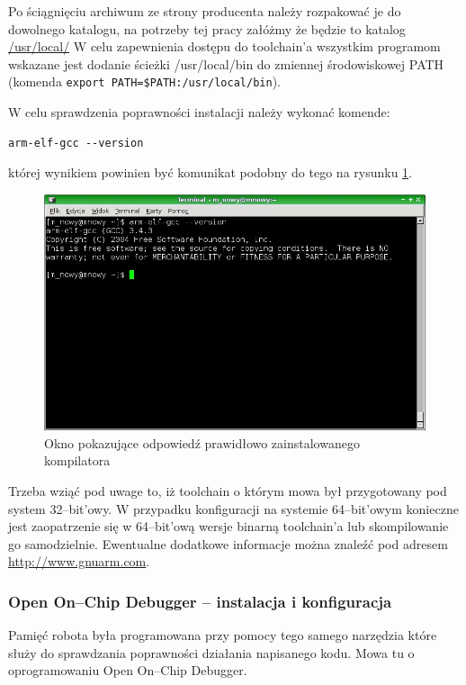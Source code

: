 Po ściągnięciu archiwum ze strony producenta należy rozpakować je do dowolnego
katalogu, na potrzeby tej pracy załóżmy że będzie to katalog \url{/usr/local/} W
celu zapewnienia dostępu do toolchain'a wszystkim programom wskazane jest
dodanie ścieżki /usr/local/bin do zmiennej środowiskowej PATH (komenda 
\verb|export PATH=$PATH:/usr/local/bin|).

W celu sprawdzenia poprawności instalacji należy wykonać komende:
\begin{verbatim}
arm-elf-gcc --version 
\end{verbatim}
której wynikiem powinien być komunikat podobny do tego na rysunku \ref{fig:arm-elf-gcc-test}.

\begin{figure}
 \centering
 \includegraphics[width=150.0mm]{../images/arm-elf-gcc-test.jpg}
 \caption{Okno pokazujące odpowiedź prawidłowo zainstalowanego kompilatora}
 \label{fig:arm-elf-gcc-test}
\end{figure}

Trzeba wziąć pod uwage to, iż toolchain o którym mowa był przygotowany pod system
32--bit'owy. W przypadku konfiguracji na systemie 64--bit'owym konieczne jest
zaopatrzenie się w 64--bit'ową wersje binarną toolchain'a lub skompilowanie go
samodzielnie. Ewentualne dodatkowe informacje można znaleźć pod adresem
\url{http://www.gnuarm.com}.

\subsubsection{Open On--Chip Debugger -- instalacja i konfiguracja}
\label{roz:opendocd-install}
Pamięć robota była programowana przy pomocy tego samego narzędzia które służy do
sprawdzania poprawności działania napisanego kodu. Mowa tu o oprogramowaniu Open
On--Chip Debugger.

